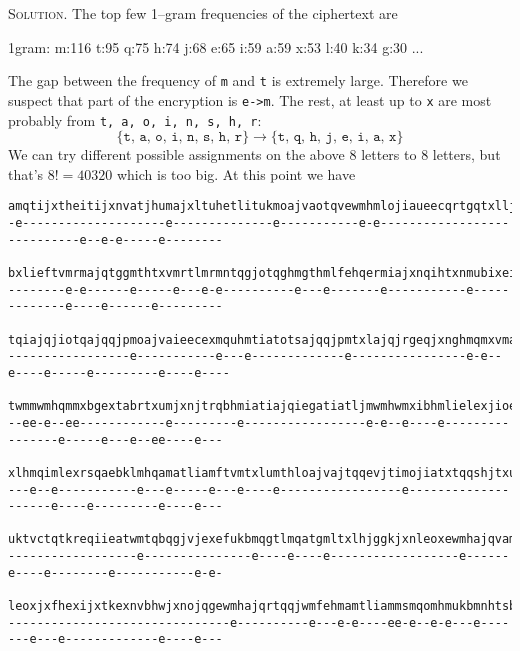 \textsc{Solution}.
The top few 1--gram frequencies of the ciphertext are
\begin{console}
1gram: m:116 t:95 q:75 h:74 j:68 e:65 i:59 a:59 x:53 l:40 k:34 g:30 ...  
\end{console}
The gap between the frequency of \verb!m! and \verb!t! is extremely large.
Therefore we suspect that part of the encryption is \verb!e->m!.
The rest, at least up to \verb!x! are most probably from 
\texttt{t, a, o, i, n, s, h, r}:
\[
  \{ \texttt{t, a, o, i, n, s, h, r} \} \rightarrow \{ \texttt{t, q, h, j, e, i, a, x} \}
\]
We can try different possible assignments on the above 8 letters to 8 letters, but that's $8! = 40320$
which is too big.
At this point we have
  \begin{Verbatim}[frame=single,fontsize=\tiny]
amqtijxtheitijxnvatjhumajxltuhetlitukmoajvaotqvewmhmlojiaueecqrtgqtxlljtnhtrqtqjmximhmlajqqmtiqgbxhe
-e--------------------e--------------e-----------e-e----------------------------e--e-e-----e--------

bxlieftvmrmajqtggmthtxvmrtlmrmntqgjotqghmgthmlfehqermiajxnqihtxnmubixeifehqeewmhgeomhjxntgmhqextkjis
--------e-e------e-----e---e-e----------e---e-------e-----------e-------------e----e------e---------

tqiajqjiotqajqqjpmoajvaieecexmquhmtiatotsajqqjpmtxlajqjrgeqjxnghmqmxvmajqamtlotqmxehrebqiamkthnmqija
-----------------e-----------e---e-------------e----------------e-e--e----e-----e---------e----e----

twmmwmhqmmxbgextabrtxumjxnjtrqbhmiatiajqiegatiatljmwmhwmxibhmlielexjioebklatwmqkjggmlewmhrmmxijhmkst
--ee-e--ee------------e---------e-----------------e-e--e----e----------------e-----e---e--ee----e---

xlhmqimlexrsqaebklmhqamatliamftvmtxlumthloajvajtqqevjtimojiatxtqqshjtxubkkiamfehrmhfkehjliamktiimhqe
---e--e-----------e---e-----e---e----e-----------------e--------------------e----e---------e----e---

uktvctqtkreqiieatwmtqbqgjvjexefukbmqgtlmqatgmltxlhjggkjxnleoxewmhajqvamqiiamatjhotqgmvbkjthgktqimhml
------------------e---------------e----e----e------------------e------e----e--------e-----------e-e-

leoxjxfhexijxtkexnvbhwjxnojqgewmhajqrtqqjwmfehmamtliammsmqomhmukbmnhtsbxlmhnhmtiuktvcibfiqwmhsvkmthw
-------------------------------e----------e---e-e----ee-e--e-e---e-------e---e-------------e----e---


\end{Verbatim}
